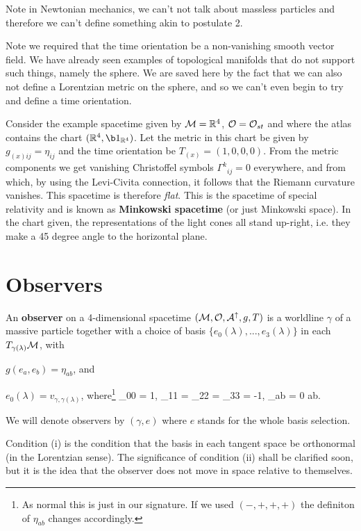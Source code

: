 \br 
    Note in Newtonian mechanics, we can't not talk about massless particles and therefore we can't define something akin to postulate 2. 
\er 

\br 
    Note we required that the time orientation be a non-vanishing smooth vector field. We have already seen examples of topological manifolds that do not support such things, namely the sphere. We are saved here by the fact that we can also not define a Lorentzian metric on the sphere, and so we can't even begin to try and define a time orientation. 
\er 

\bex 
    Consider the example spacetime given by $\mathcal{M}=\mathbb{R}^4$, $\mathcal{O}=\mathcal{O}_{st}$ and where the atlas contains the chart $(\R^4,\b1_{\R^4})$. Let the metric in this chart be given by $g_{(x)ij}=\eta_{ij}$ and the time orientation be $T_{(x)} = (1,0,0,0)$. From the metric components we get vanishing Christoffel symbols ${\Gamma^k}_{ij}=0$ everywhere, and from which, by using the Levi-Civita connection, it follows that the Riemann curvature vanishes. This spacetime is therefore \textit{flat}. This is the spacetime of special relativity and is known as \textbf{Minkowski spacetime} (or just Minkowski space). In the chart given, the representations of the light cones all stand up-right, i.e. they make a 45 degree angle to the horizontal plane.
\eex 

\section{Observers}

\bd[Observer]
    An \textbf{observer} on a 4-dimensional spacetime $(\mathcal{M},\mathcal{O},\mathcal{A}^{\uparrow},g,T)$ is a worldline $\gamma$ of a massive particle together with a choice of basis $\{e_0(\lambda),...,e_3(\lambda)\}$ in each $T_{\gamma(\lambda)}\mathcal{M}$, with 
    \benr 
        \item $g(e_a,e_b) = \eta_{ab}$, and 
        \item $e_0(\lambda) = v_{\gamma,\gamma(\lambda)}$,
    \een 
    where\footnote{As normal this is just in our signature. If we used $(-,+,+,+)$ the definiton of $\eta_{ab}$ changes accordingly.}
    \bse 
        \eta_{00} = 1, \qquad \eta_{11} = \eta_{22} = \eta_{33} = -1, \qand \eta_{ab} = 0 \quad \forall a\neq b.
    \ese 
\ed 

\bnn 
    We will denote observers by $(\gamma,e)$ where $e$ stands for the whole basis selection. 
\enn 

Condition (i) is the condition that the basis in each tangent space be orthonormal (in the Lorentzian sense). The significance of condition (ii) shall be clarified soon, but it is the idea that the observer does not move in space relative to themselves. 

